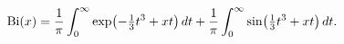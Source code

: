 \[\mathop{\mathrm{Bi}\/}\nolimits\!\left(x\right)=\frac{1}{\pi}\int_{0}^{\infty}%
\mathop{\exp\/}\nolimits\!\left(-{\tfrac{1}{3}}t^{3}+xt\right)dt+\frac{1}{\pi}%
\int_{0}^{\infty}\mathop{\sin\/}\nolimits\!\left(\tfrac{1}{3}t^{3}+xt\right)dt.\]